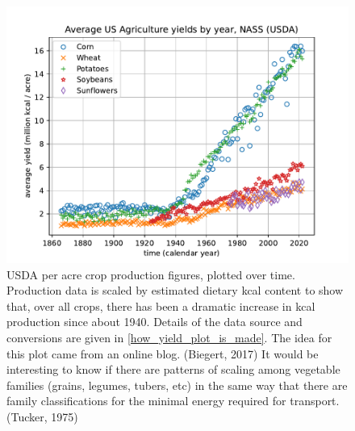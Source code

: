\documentclass[11pt,letter]{article}
\begin{document}
\begin{figure}[ht!]
\centering
\includegraphics[width=\columnwidth]{kcal_per_acre_yields.pdf}
\caption{
USDA per acre crop production figures, plotted over time.  Production data is scaled by estimated dietary kcal content to show that, over all crops, there has been a dramatic increase in kcal production since about 1940.  
Details of the data source and conversions are given in \ref{how_yield_plot_is_made}.
The idea for this plot came from an online blog. (Biegert, 2017)
It would be interesting to know if there are patterns of scaling among vegetable families (grains, legumes, tubers, etc) in the same way that there are family classifications for the minimal energy required for transport. (Tucker, 1975)
}
\label{ag_yields}
\end{figure}
%
\end{document}
